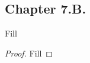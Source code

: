 \subsection*{Chapter 7.B. }


\begin{exercise}{1}
  Fill
\end{exercise}
\begin{proof}
 Fill
\end{proof}